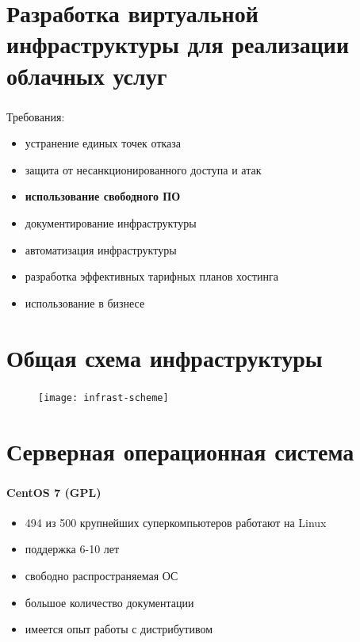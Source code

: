 
\frame[plain]{\titlepage} %


\section{Разработка виртуальной инфраструктуры для реализации облачных услуг}

\begin{frame}
\frametitle{\insertsection}
Требования:
\begin{itemize}
	\item устранение единых точек отказа
	\item защита от несанкционированного доступа и атак
	\item \textbf{использование свободного ПО}
	\item документирование инфраструктуры
	\item автоматизация инфраструктуры
	\item разработка эффективных тарифных планов хостинга
	\item использование в бизнесе
\end{itemize}
\end{frame}


\section{Общая схема инфраструктуры}

\begin{frame}
\frametitle{\insertsection}
\begin{figure}[h]
	\center
	\texttt{[image: infrast-scheme]}
\end{figure}
\end{frame}


\section{Серверная операционная система}

\begin{frame}
\frametitle{\insertsection}
\framesubtitle{CentOS 7 (GPL)}
\begin{itemize}
	\item 494 из 500 крупнейших суперкомпьютеров работают на Linux
	\item поддержка 6-10 лет
	\item свободно распространяемая ОС
	\item большое количество документации
	\item имеется опыт работы с дистрибутивом
\end{itemize}
\end{frame}

